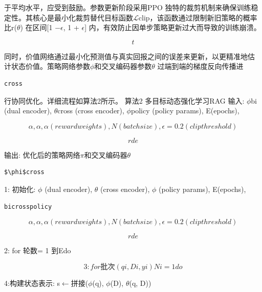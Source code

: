 \documentclass[12pt,a4paper,openright,UTF8]{ctexbook}
\begin{document}
于平均水平，应受到鼓励。参数更新阶段采用PPO 独特的裁剪机制来确保训练稳 定性。其核心是最小化裁剪替代目标函数$\mathcal{L}$clip，该函数通过限制新旧策略的概率 比r($\theta$) 在区间[1 −$\epsilon$, 1 + $\epsilon$] 内，有效防止因单步策略更新过大而导致的训练崩溃。

\begin{equation*}
t
\end{equation*}

同时，价值网络通过最小化预测值与真实回报之间的误差来更新，以更精准地估 计状态价值。策略网络参数$\phi$和交叉编码器参数$\theta$ 过端到端的梯度反向传播进

\begin{lstlisting}
cross
\end{lstlisting}
行协同优化。详细流程如算法2所示。 算法2 多目标动态强化学习RAG 输入: $\phi$bi (dual encoder), $\theta$cross (cross encoder), $\phi$policy (policy params), E(epochs),

\begin{equation*}
{\alpha, \alpha, \alpha} (reward weights), N(batch size), \epsilon= 0.2 (clip threshold)
\end{equation*}

\begin{equation*}
rde
\end{equation*}

输出: 优化后的策略网络$\pi$和交叉编码器$\theta$

\begin{lstlisting}
$\phi$cross
\end{lstlisting}
1: 初始化: $\phi$ (dual encoder), $\theta$ (cross encoder), $\phi$ (policy params), E(epochs),

\begin{lstlisting}
bicrosspolicy
\end{lstlisting}

\begin{equation*}
{\alpha, \alpha, \alpha} (reward weights), N(batch size), \epsilon= 0.2 (clip threshold)
\end{equation*}

\begin{equation*}
rde
\end{equation*}

2: for 轮数= 1 到Edo

\begin{equation*}
3:for 批次{(qi, Di, yi)}Ni=1 do
\end{equation*}

4:构建状态表示: s$\leftarrow$拼接($\phi$(q), $\phi$(D), $\theta$(q, D))
\end{document}
